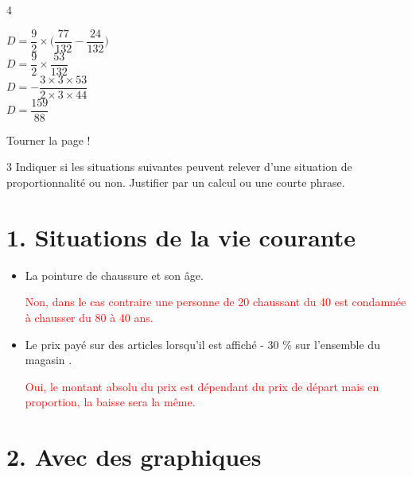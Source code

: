 \documentclass[a4paper]{book}
\begin{document}
{\begin{exerciceNote}{4}
\begin{minipage}{0.24\linewidth}
            $D = \dfrac{9}{2}\times\bigg(\dfrac{77}{132}-\dfrac{24}{132}\bigg)$ \\[2ex]

            $D = \dfrac{9}{2}\times\dfrac{53}{132}$ \\[2ex]

            $D = -\dfrac{3\times3\times53}{2\times3\times44}$ \\[2ex]

            $D = \dfrac{159}{88}$
        \end{minipage}     
    \end{exerciceNote}

\vfill
\hfill Tourner la page !

\newpage


    \begin{exerciceNote}{3}        
        Indiquer si les situations suivantes peuvent relever d'une situation de proportionnalité ou non. Justifier par un calcul ou une courte phrase.


        \section*{1. Situations de la vie courante}

        \begin{itemize}
            \item La pointure de chaussure et son âge. 

            \medskip
            
            \textcolor{red}{Non, dans le cas contraire une personne de 20 chaussant du 40 est condamnée à chausser du 80 à 40 ans.} 

            \item Le prix payé sur des articles lorsqu'il est affiché \og - 30 \% sur l'ensemble du magasin \fg. 

            \medskip

            \textcolor{red}{Oui, le montant absolu du prix est dépendant du prix de départ mais en proportion, la baisse sera la même.}
        \end{itemize}

        \section*{2. Avec des graphiques}


\end{exerciceNote}}
\end{document}
